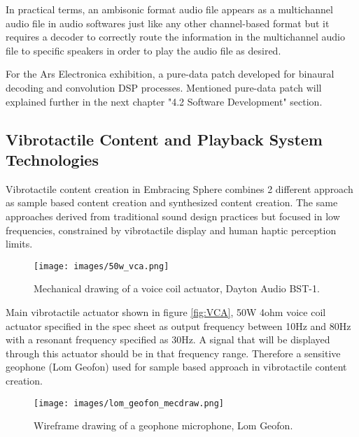             In practical terms, an ambisonic format audio file appears as a multichannel audio file in audio softwares just like any other channel-based format but it requires a decoder to correctly route the information in the multichannel audio file to specific speakers in order to play the audio file as desired.\par

            For the Ars Electronica exhibition, a pure-data patch developed for binaural decoding and convolution DSP processes. Mentioned pure-data patch will explained further in the next chapter "4.2 Software Development" section.\par
        \subsection{Vibrotactile Content and Playback System Technologies}
            Vibrotactile content creation in Embracing Sphere combines 2 different approach as sample based content creation and synthesized content creation. The same approaches derived from traditional sound design practices but focused in low frequencies, constrained by vibrotactile display and human haptic perception limits.\par

            \begin{figure}[H]
                \centering
                \texttt{[image: images/50w\_vca.png]}
                \caption{Mechanical drawing of a voice coil actuator, Dayton Audio BST-1.}
                \label{fig:VCA_MECDRAW}
            \end{figure}

            Main vibrotactile actuator shown in figure \ref{fig:VCA}, 50W 4ohm voice coil actuator specified in the spec sheet as output frequency between 10Hz and 80Hz with a resonant frequency specified as 30Hz. A signal that will be displayed through this actuator should be in that frequency range. Therefore a sensitive geophone (Lom Geofon) used for sample based approach in vibrotactile content creation.\par

            \begin{figure}[H]
                \centering
                \texttt{[image: images/lom\_geofon\_mecdraw.png]}
                \caption{Wireframe drawing of a geophone microphone, Lom Geofon.}
                \label{fig:WF_GEOFON}
            \end{figure}

